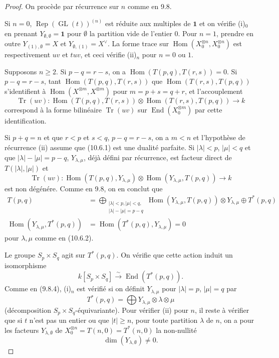\documentclass[11pt,a4paper]{article}
\theoremstyle{plain}
\theoremstyle{definition}
\DeclareMathOperator{\Hom}{Hom}
\DeclareMathOperator{\End}{End}
\DeclareMathOperator{\Tr}{Tr}
\DeclareMathOperator{\Rep}{Rep}
\DeclareMathOperator{\GL}{GL}
\newcommand{\isom}{\xrightarrow{\sim}}
\begin{document}
\begin{proof}
On proc\`ede par r\'ecurrence sur $n$ comme en 9.8.

Si $n = 0$, $\Rep(\GL(t))^{(n)}$ est r\'eduite aux multiples de $\mathbf{1}$ et on v\'erifie (i)$_0$ en prenant $Y_{\emptyset, \emptyset} = \mathbf{1}$ pour $\emptyset$ la partition vide de l'entier $0$. Pour $n = 1$, prendre en outre $Y_{(1), \emptyset} = X$ et $Y_{\emptyset, (1)} = X^\vee$. La forme trace sur $\Hom(X_0^{\otimes n}, X_0^{\otimes n})$ est respectivement $uv$ et $tuv$, et ceci v\'erifie (ii)$_n$ pour $n = 0$ ou $1$.

Supposons $n \geq 2$. Si $p - q = r - s$, on a $\Hom(T(p, q), T(r, s)) = 0$. Si $p - q = r - s$, tant $\Hom(T(p, q), T(r, s))$ que $\Hom(T(r, s), T(p, q))$ s'identifient \`a $\Hom(X^{\otimes m}, X^{\otimes m})$ pour $m = p + s = q + r$, et l'accouplement
\begin{equation}
\Tr(uv) : \Hom(T(p, q), T(r, s)) \otimes \Hom(T(r, s), T(p, q)) \to k \tag{10.6.1}
\end{equation}
correspond \`a la forme bilin\'eaire $\Tr(uv)$ sur $\End(X_0^{\otimes m})$ par cette identification.

Si $p + q = n$ et que $r < p$ et $s < q$, $p - q = r - s$, on a $m < n$ et l'hypoth\`ese de r\'ecurrence (ii) assume que (10.6.1) est une dualit\'e parfaite. Si $|\lambda| < p$, $|\mu| < q$ et que $|\lambda| - |\mu| = p - q$, $Y_{\lambda, \mu}$, d\'ej\`a d\'efini par r\'ecurrence, est facteur direct de $T(|\lambda|, |\mu|)$ et
\[
\Tr(uv) : \Hom(T(p, q), Y_{\lambda, \mu}) \otimes \Hom(Y_{\lambda, \mu}, T(p, q)) \to k
\]
est non d\'eg\'en\'ere. Comme en 9.8, on en conclut que
\begin{align}
T(p, q) &= \bigoplus_{\substack{|\lambda| < p, |\mu| < q, \\ |\lambda| - |\mu| = p - q}} \Hom(Y_{\lambda, \mu}, T(p, q)) \otimes Y_{\lambda, \mu} \oplus T^*(p, q) \tag{10.6.2} \\
\Hom(Y_{\lambda, \mu}, T^*(p, q)) &= \Hom(T^*(p, q), Y_{\lambda, \mu}) = 0 \tag{10.6.3}
\end{align}
pour $\lambda, \mu$ comme en (10.6.2).

Le groupe $S_p \times S_q$ agit sur $T^*(p, q)$. On v\'erifie que cette action induit un isomorphisme
\[
k[S_p \times S_q] \isom \End(T^*(p, q)).
\]
Comme en (9.8.4), (i)$_n$ est v\'erifi\'e si on d\'efinit $Y_{\lambda, \mu}$ pour $|\lambda| = p$, $|\mu| = q$ par
\begin{equation}
T^*(p, q) = \bigoplus Y_{\lambda, \mu} \otimes \lambda \otimes \mu \tag{10.6.4}
\end{equation}
(d\'ecomposition $S_p \times S_q$-\'equivariante). Pour v\'erifier (ii) pour $n$, il reste \`a v\'erifier que si $t$ n'est pas un entier ou que $|t| \geq n$, pour toute partition $\lambda$ de $n$, on a pour les facteurs $Y_{\lambda, \emptyset}$ de $X_0^{\otimes n} = T(n, 0) = T^*(n, 0)$ la non-nullit\'e
\begin{equation}
\dim(Y_{\lambda, \emptyset}) \neq 0. \tag{10.6.5}
\end{equation}


\end{proof}
\end{document}
